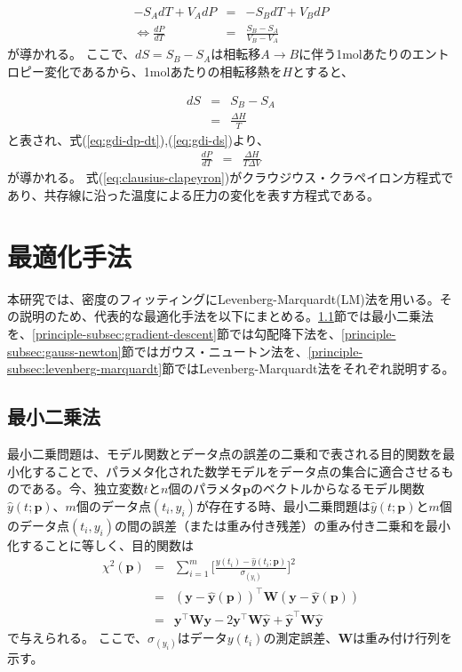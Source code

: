 \documentclass[titlepage]{jsreport}
\begin{document}
\large
\begin{eqnarray}
-S_AdT+V_AdP &=& -S_BdT+V_BdP \nonumber \\
\Leftrightarrow \frac{dP}{dT} &=& \frac{S_B-S_A}{V_B-V_A} \label{eq:gdi-dp-dt}
\end{eqnarray}
\normalsize
が導かれる。
ここで、$dS=S_B-S_A$は相転移$A\rightarrow{B}$に伴う1molあたりのエントロピー変化であるから、1molあたりの相転移熱を$H$とすると、

\large
\begin{eqnarray}
dS &=& S_B-S_A \nonumber \\
   &=& \frac{\Delta{H}}{T} \label{eq:gdi-ds}
\end{eqnarray}
\normalsize
と表され、式(\ref{eq:gdi-dp-dt}),(\ref{eq:gdi-ds})より、
\large
\begin{eqnarray}
\frac{dP}{dT} &=& \frac{\Delta{H}}{T\Delta{V}} \label{eq:clausius-clapeyron}
\end{eqnarray}
\normalsize
が導かれる。
式(\ref{eq:clausius-clapeyron})がクラウジウス・クラペイロン方程式であり、共存線に沿った温度による圧力の変化を表す方程式である\cite{atkins, clausius-clapeyron1}。


\section{最適化手法}\label{principle-sec:optimization-method}
本研究では、密度のフィッティングにLevenberg-Marquardt(LM)法を用いる。その説明のため、代表的な最適化手法を以下にまとめる。\ref{principle-subsec:least-squares}節では最小二乗法を、\ref{principle-subsec:gradient-descent}節では勾配降下法を、\ref{principle-subsec:gauss-newton}節ではガウス・ニュートン法を、\ref{principle-subsec:levenberg-marquardt}節ではLevenberg-Marquardt法をそれぞれ説明する。

\subsection{最小二乗法}\label{principle-subsec:least-squares}
最小二乗問題は、モデル関数とデータ点の誤差の二乗和で表される目的関数を最小化することで、パラメタ化された数学モデルをデータ点の集合に適合させるものである。今、独立変数$t$と$n$個のパラメタ$\bm{p}$のベクトルからなるモデル関数$\hat{y}(t;\bm{p})$、$m$個のデータ点$(t_i, y_i)$が存在する時、最小二乗問題は$\hat{y}(t;\bm{p})$と$m$個のデータ点$(t_i, y_i)$の間の誤差（または重み付き残差）の重み付き二乗和を最小化することに等しく、目的関数は
\large
\begin{eqnarray}
\chi^2(\bm{p}) &=& \sum_{i=1}^{m}\Bigg[\frac{y(t_i)-\hat{y}(t_i;\bm{p})}{\sigma_{(y_i)}}\Bigg]^2 \nonumber\\
               &=& (\bm{y}-\hat{\bm{y}}(\bm{p}))^\top\bm{W}(\bm{y}-\hat{\bm{y}}(\bm{p})) \nonumber\\
               &=& \bm{y}^\top\bm{W}\bm{y}-2\bm{y}^\top\bm{W}\hat{\bm{y}}+\hat{\bm{y}}^\top\bm{W}\hat{\bm{y}} \label{eq:queue-residual-error}
\end{eqnarray}
\normalsize
で与えられる。
ここで、$\sigma_{(y_i)}$はデータ$y(t_i)$の測定誤差、$\bm{W}$は重み付け行列を示す\cite{gradient-descent_gauss-newton_levenberg-marquardt}。
\end{document}
